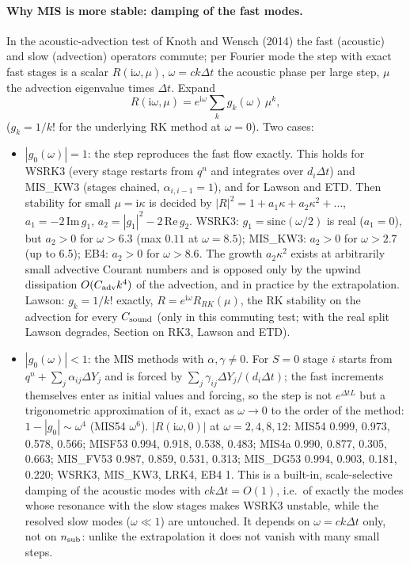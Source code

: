 \documentclass[11pt,a4paper]{article}
\newcommand{\dt}{\Delta t}
\begin{document}
\paragraph{Why MIS is more stable: damping of the fast modes.} In the acoustic-advection test of Knoth
and Wensch (2014) the fast (acoustic) and slow (advection) operators commute; per Fourier mode the
step with exact fast stages is a scalar $R(\mathrm i\omega,\mu)$, $\omega=ck\dt$ the acoustic phase per
large step, $\mu$ the advection eigenvalue times $\dt$. Expand
\[
R(\mathrm i\omega,\mu)=e^{\mathrm i\omega}\sum_k g_k(\omega)\,\mu^k ,
\]
($g_k=1/k!$ for the underlying RK method at $\omega=0$). Two cases:
\begin{itemize}
\item $|g_0(\omega)|=1$: the step reproduces the fast flow exactly. This holds for WSRK3 (every stage
restarts from $q^n$ and integrates over $d_i\dt$) and MIS\_KW3 (stages chained, $\alpha_{i,i-1}=1$), and
for Lawson and ETD. Then stability for small $\mu=\mathrm i\kappa$ is decided by
$|R|^2=1+a_1\kappa+a_2\kappa^2+\dots$, $a_1=-2\,\mathrm{Im}\,g_1$, $a_2=|g_1|^2-2\,\mathrm{Re}\,g_2$. WSRK3:
$g_1=\mathrm{sinc}(\omega/2)$ is real ($a_1=0$), but $a_2>0$ for $\omega>6.3$ (max $0.11$ at
$\omega=8.5$); MIS\_KW3: $a_2>0$ for $\omega>2.7$ (up to 6.5); EB4: $a_2>0$ for $\omega>8.6$. The growth
$a_2\kappa^2$ exists at arbitrarily small advective Courant numbers and is opposed only by the upwind
dissipation $O(C_{\rm adv}k^4)$ of the advection, and in practice by the extrapolation. Lawson:
$g_k=1/k!$ exactly, $R=e^{\mathrm i\omega}R_{RK}(\mu)$, the RK stability on the advection for every
$C_{\rm sound}$ (only in this commuting test; with the real split Lawson degrades, Section on RK3, Lawson
and ETD).
\item $|g_0(\omega)|<1$: the MIS methods with $\alpha,\gamma\neq0$. For $S=0$ stage $i$ starts from
$q^n+\sum_j\alpha_{ij}\Delta Y_j$ and is forced by $\sum_j\gamma_{ij}\Delta Y_j/(d_i\dt)$; the fast
increments themselves enter as initial values and forcing, so the step is not $e^{\dt L}$ but a
trigonometric approximation of it, exact as $\omega\to0$ to the order of the method:
$1-|g_0|\sim\omega^4$ (MIS54 $\omega^6$). $|R(\mathrm i\omega,0)|$ at $\omega=2,4,8,12$: MIS54 0.999, 0.973,
0.578, 0.566; MISF53 0.994, 0.918, 0.538, 0.483; MIS4a 0.990, 0.877, 0.305, 0.663; MIS\_FV53 0.987, 0.859,
0.531, 0.313; MIS\_DG53 0.994, 0.903, 0.181, 0.220; WSRK3, MIS\_KW3, LRK4, EB4 1. This is a built-in,
scale-selective damping of the acoustic modes with $ck\dt=O(1)$, i.e.\ of exactly the modes whose
resonance with the slow stages makes WSRK3 unstable, while the resolved slow modes ($\omega\ll1$) are
untouched. It depends on $\omega=ck\dt$ only, not on $n_{\rm sub}$: unlike the extrapolation it does not
vanish with many small steps.
\end{itemize}
\end{document}
